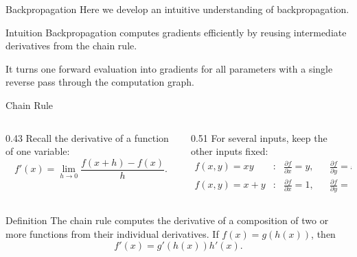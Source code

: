 \documentclass[aspectratio=169]{beamer}
\begin{document}
\begin{frame}{Backpropagation}
  Here we develop an intuitive understanding of backpropagation.

  \begin{block}{Intuition}
    Backpropagation computes gradients efficiently by reusing intermediate
    derivatives from the chain rule.
  \end{block}

  It turns one forward evaluation into gradients for all parameters with a
  single reverse pass through the computation graph.
\end{frame}

\begin{frame}{Chain Rule}
  \small
  \begin{columns}[T]
    \begin{column}{0.43\textwidth}
      Recall the derivative of a function of one variable:
      \begin{equation*}
        f'(x)
        =
        \lim_{h \to 0}
        \frac{f(x+h)-f(x)}{h}.
      \end{equation*}
    \end{column}
    \begin{column}{0.51\textwidth}
      For several inputs, keep the other inputs fixed:
      \begin{align*}
        f(x,y)=xy
        &:& \frac{\partial f}{\partial x}=y,
        && \frac{\partial f}{\partial y}=x, \\
        f(x,y)=x+y
        &:& \frac{\partial f}{\partial x}=1,
        && \frac{\partial f}{\partial y}=1.
      \end{align*}
    \end{column}
  \end{columns}

  \begin{block}{Definition}
    The chain rule computes the derivative of a composition of two or more
    functions from their individual derivatives. If $f(x)=g(h(x))$, then
    \begin{equation*}
      f'(x)=g'(h(x))h'(x).
    \end{equation*}
  \end{block}
\end{frame}
\end{document}
